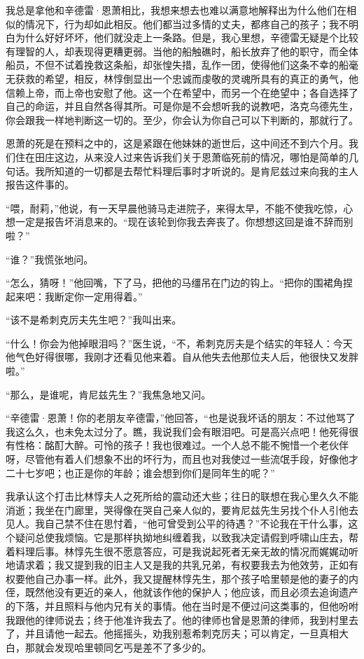 \par 我总是拿他和辛德雷·恩萧相比，我想来想去也难以满意地解释出为什么他们在相似的情况下，行为却如此相反。他们都当过多情的丈夫，都疼自己的孩子；我不明白为什么好好坏坏，他们就没走上一条路。但是，我心里想，辛德雷无疑是个比较有理智的人，却表现得更糟更弱。当他的船触礁时，船长放弃了他的职守，而全体船员，不但不试着挽救这条船，却张惶失措，乱作一团，使得他们这条不幸的船毫无获救的希望，相反，林惇倒显出一个忠诚而虔敬的灵魂所具有的真正的勇气，他信赖上帝，而上帝也安慰了他。这一个在希望中，而另一个在绝望中；各自选择了自己的命运，并且自然各得其所。可是你是不会想听我的说教吧，洛克乌德先生，你会跟我一样地判断这一切的。至少，你会认为你自己可以下判断的，那就行了。
\par 恩萧的死是在预料之中的，这是紧跟在他妹妹的逝世后，这中间还不到六个月。我们住在田庄这边，从来没人过来告诉我们关于恩萧临死前的情况，哪怕是简单的几句话。我所知道的一切都是去帮忙料理后事时才听说的。是肯尼兹过来向我的主人报告这件事的。
\par “喂，耐莉，”他说，有一天早晨他骑马走进院子，来得太早，不能不使我吃惊，心想一定是报告坏消息来的。“现在该轮到你我去奔丧了。你想想这回是谁不辞而别啦？”
\par “谁？”我慌张地问。
\par “怎么，猜呀！”他回嘴，下了马，把他的马缰吊在门边的钩上。“把你的围裙角捏起来吧：我断定你一定用得着。”
\par “该不是希刺克厉夫先生吧？”我叫出来。
\par “什么！你会为他掉眼泪吗？”医生说，“不，希刺克厉夫是个结实的年轻人：今天他气色好得很哪，我刚才还看见他来着。自从他失去他那位夫人后，他很快又发胖啦。”
\par “那么，是谁呢，肯尼兹先生？”我焦急地又问。
\par “辛德雷·恩萧！你的老朋友辛德雷，”他回答，“也是说我坏话的朋友：不过他骂了我这么久，也未免太过分了。瞧，我说我们会有眼泪吧。可是高兴点吧！他死得很有性格：酩酊大醉。可怜的孩子！我也很难过。一个人总不能不惋惜一个老伙伴呀，尽管他有着人们想象不出的坏行为，而且也对我使过一些流氓手段，好像他才二十七岁吧；也正是你的年龄；谁会想到你们是同年生的呢？”
\par 我承认这个打击比林惇夫人之死所给的震动还大些；往日的联想在我心里久久不能消逝；我坐在门廊里，哭得像在哭自己亲人似的，要肯尼兹先生另找个仆人引他去见人。我自己禁不住在思忖着，“他可曾受到公平的待遇？”不论我在干什么事，这个疑问总使我烦恼。它是那样执拗地纠缠着我，以致我决定请假到呼啸山庄去，帮着料理后事。林惇先生很不愿意答应，可是我说起死者无亲无故的情况而娓娓动听地请求着；我又提到我的旧主人又是我的共乳兄弟，有权要我去为他效劳，正如有权要他自己办事一样。此外，我又提醒林惇先生，那个孩子哈里顿是他的妻子的内侄，既然他没有更近的亲人，他就该作他的保护人；他应该，而且必须去追询遗产的下落，并且照料与他内兄有关的事情。他在当时是不便过问这类事的，但他吩咐我跟他的律师说去；终于他准许我去了。他的律师也曾是恩萧的律师，我到村里去了，并且请他一起去。他摇摇头，劝我别惹希刺克厉夫；可以肯定，一旦真相大白，那就会发现哈里顿同乞丐是差不了多少的。
